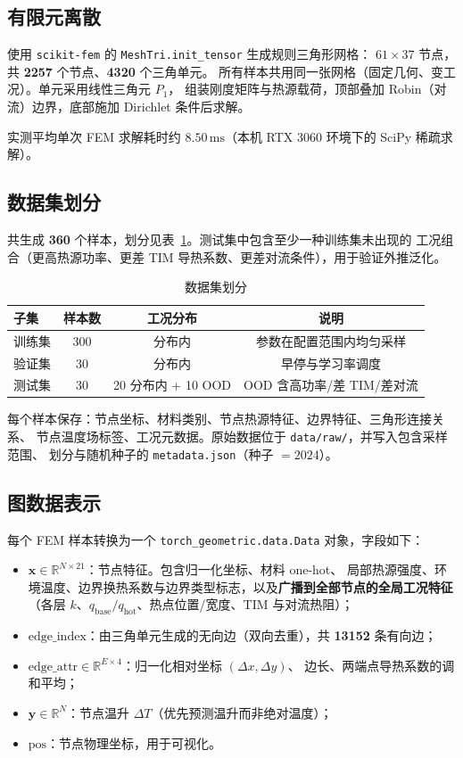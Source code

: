 \documentclass[11pt,a4paper]{article}
\begin{document}
\subsection{有限元离散}
使用 \texttt{scikit-fem} 的 \texttt{MeshTri.init\_tensor} 生成规则三角形网格：
\(61\times 37\) 节点，共 \textbf{2257} 个节点、\textbf{4320} 个三角单元。
所有样本共用同一张网格（固定几何、变工况）。单元采用线性三角元 \(P_1\)，
组装刚度矩阵与热源载荷，顶部叠加 Robin（对流）边界，底部施加 Dirichlet 条件后求解。

实测平均单次 FEM 求解耗时约 \(\mathbf{8.50\,\mathrm{ms}}\)（本机 RTX 3060 环境下的 SciPy
稀疏求解）。

\subsection{数据集划分}
共生成 \textbf{360} 个样本，划分见表~\ref{tab:split}。测试集中包含至少一种训练集未出现的
工况组合（更高热源功率、更差 TIM 导热系数、更差对流条件），用于验证外推泛化。

\begin{table}[H]
\centering
\caption{数据集划分}
\label{tab:split}
\begin{tabular}{lccc}
\toprule
子集 & 样本数 & 工况分布 & 说明 \\
\midrule
训练集 & 300 & 分布内 & 参数在配置范围内均匀采样 \\
验证集 & 30 & 分布内 & 早停与学习率调度 \\
测试集 & 30 & 20 分布内 + 10 OOD & OOD 含高功率/差 TIM/差对流 \\
\bottomrule
\end{tabular}
\end{table}

每个样本保存：节点坐标、材料类别、节点热源特征、边界特征、三角形连接关系、
节点温度场标签、工况元数据。原始数据位于 \texttt{data/raw/}，并写入包含采样范围、
划分与随机种子的 \texttt{metadata.json}（种子 \(=2024\)）。

\subsection{图数据表示}
每个 FEM 样本转换为一个 \texttt{torch\_geometric.data.Data} 对象，字段如下：

\begin{itemize}[leftmargin=1.5em]
  \item \(\mathbf{x}\in\mathbb{R}^{N\times 21}\)：节点特征。包含归一化坐标、材料 one-hot、
  局部热源强度、环境温度、边界换热系数与边界类型标志，以及\textbf{广播到全部节点的全局工况特征}
  （各层 \(k\)、\(q_{\mathrm{base}}/q_{\mathrm{hot}}\)、热点位置/宽度、TIM 与对流热阻）；
  \item \(\mathrm{edge\_index}\)：由三角单元生成的无向边（双向去重），共 \textbf{13152} 条有向边；
  \item \(\mathrm{edge\_attr}\in\mathbb{R}^{E\times 4}\)：归一化相对坐标 \((\Delta x,\Delta y)\)、
  边长、两端点导热系数的调和平均；
  \item \(\mathbf{y}\in\mathbb{R}^{N}\)：节点温升 \(\Delta T\)（优先预测温升而非绝对温度）；
  \item \(\mathrm{pos}\)：节点物理坐标，用于可视化。
\end{itemize}
\end{document}
